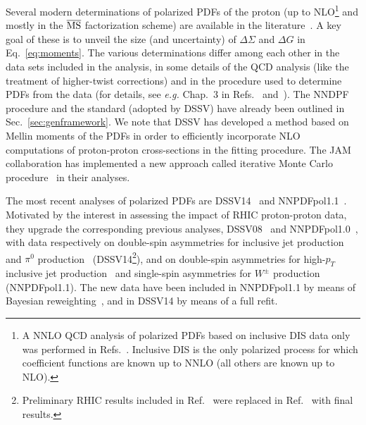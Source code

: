 Several modern determinations of polarized PDFs of the proton (up to 
NLO\footnote{A NNLO QCD analysis of polarized PDFs based on inclusive DIS
data only was performed in Refs.~\cite{Shahri:2016uzl,Khanpour:2017cha}.
Inclusive DIS is the only polarized process for which coefficient functions
are known up to NNLO (all others are known up to NLO).} 
and mostly in the $\overline{\rm MS}$ factorization scheme) are available in 
the literature~\cite{Nocera:2014gqa,Nocera:2016xhb,deFlorian:2014yva,deFlorian:2008mr,deFlorian:2009vb,Sato:2016tuz,Leader:2010rb,Blumlein:2010rn,Bourrely:2014uha,Hirai:2008aj}. 
%
A key goal of these is to unveil the size (and uncertainty) of
$\Delta\Sigma$ and  $\Delta G$ in Eq.~\eqref{eq:moments}. 
%
The various determinations differ among each other in the data sets included 
in the analysis, in some details of the QCD analysis (like the treatment of 
higher-twist corrections) and in the procedure used to determine PDFs from the 
data (for details, see {\it e.g.} Chap.~3 in Refs.~\cite{Nocera:2014vla} 
and~\cite{Nocera:2016xhb,Jimenez-Delgado:2013sma}). 
%
The NNDPF procedure and the standard (adopted by DSSV) have 
already been outlined in Sec.~\ref{sec:genframework}. 
%
We note that DSSV has developed a method based on Mellin moments of the PDFs 
in order to efficiently incorporate NLO computations
of proton-proton cross-sections in the fitting procedure. 
%
The JAM collaboration has implemented a new approach called 
iterative Monte Carlo procedure~\cite{Sato:2016tuz,Ethier:2017zbq}
in their analyses.

The most recent analyses of polarized PDFs are DSSV14~\cite{deFlorian:2014yva}
and NNPDFpol1.1~\cite{Nocera:2014gqa}.
%
Motivated by the interest in assessing the impact of RHIC proton-proton 
data, they upgrade the corresponding previous analyses, 
DSSV08~\cite{deFlorian:2008mr,deFlorian:2009vb} and 
NNPDFpol1.0~\cite{Ball:2013lla}, with data respectively on double-spin 
asymmetries for inclusive jet production~\cite{Adamczyk:2014ozi} 
and $\pi^0$ production~\cite{Adare:2014hsq} (DSSV14\footnote{Preliminary 
RHIC results included in Ref.~\cite{deFlorian:2008mr} were replaced in
Ref.~\cite{deFlorian:2014yva} with final results.}), 
and on double-spin asymmetries for high-$p_T$ inclusive jet 
production~\cite{Adamczyk:2014ozi,Adamczyk:2012qj,Adare:2010cc} and single-spin
asymmetries for $W^\pm$ production~\cite{Adamczyk:2014xyw} (NNPDFpol1.1).
%
The new data have been included in NNPDFpol1.1 
by means of Bayesian reweighting~\cite{Ball:2010gb},
and in DSSV14 by means of a full refit.  

